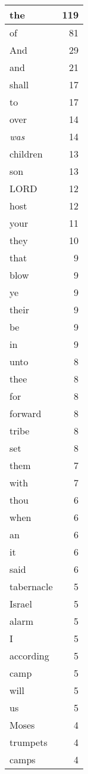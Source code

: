 \begin{center}
\begin{longtable}{l|r}
\hline \hline
\endlastfoot
the & 119 \\ \hline
of & 81 \\ \hline
And & 29 \\ \hline
and & 21 \\ \hline
shall & 17 \\ \hline
to & 17 \\ \hline
over & 14 \\ \hline
\emph{was} & 14 \\ \hline
children & 13 \\ \hline
son & 13 \\ \hline
LORD & 12 \\ \hline
host & 12 \\ \hline
your & 11 \\ \hline
they & 10 \\ \hline
that & 9 \\ \hline
blow & 9 \\ \hline
ye & 9 \\ \hline
their & 9 \\ \hline
be & 9 \\ \hline
in & 9 \\ \hline
unto & 8 \\ \hline
thee & 8 \\ \hline
for & 8 \\ \hline
forward & 8 \\ \hline
tribe & 8 \\ \hline
set & 8 \\ \hline
them & 7 \\ \hline
with & 7 \\ \hline
thou & 6 \\ \hline
when & 6 \\ \hline
an & 6 \\ \hline
it & 6 \\ \hline
said & 6 \\ \hline
tabernacle & 5 \\ \hline
Israel & 5 \\ \hline
alarm & 5 \\ \hline
I & 5 \\ \hline
according & 5 \\ \hline
camp & 5 \\ \hline
will & 5 \\ \hline
us & 5 \\ \hline
Moses & 4 \\ \hline
trumpets & 4 \\ \hline
camps & 4 \\ \hline

\end{longtable}
\end{center}
